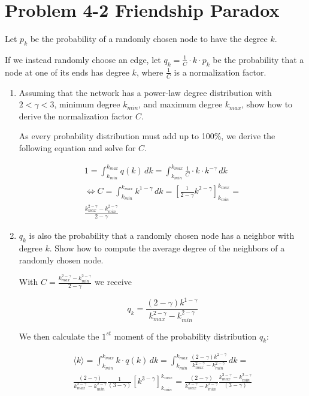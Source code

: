 \section{Problem 4-2 Friendship Paradox}

Let $p_k$ be the probability of a randomly chosen node to have the degree $k$.

If we instead randomly choose an edge, let $q_k = \frac{1}{C} \cdot k \cdot p_k$ be the probability that a node at one of its ends has degree $k$, where $\frac{1}{C}$ is a normalization factor.

\begin{enumerate}
	\item Assuming that the network has a power-law degree distribution with $2 < \gamma
< 3$, minimum degree $k_{min}$, and maximum degree $k_{max}$, show how to derive the normalization factor $C$.
	
	As every probability distribution must add up to 100\%, we derive the following equation and solve for $C$.

	\begin{equation}
		\begin{split}
		1 = \int_{k_{min}}^{k_{max}} q(k) \, dk = \int_{k_{min}}^{k_{max}} \frac{1}{C} \cdot k \cdot k^{-\gamma} \, dk \\
		\Leftrightarrow C = \int_{k_{min}}^{k_{max}} k^{1-\gamma} \, dk = [\frac{1}{2-\gamma} k^{2-\gamma}]_{k_{min}}^{k_{max}} = \\
		\frac{k_{max}^{2-\gamma} - k_{min}^{2-\gamma}}{2-\gamma}
		\end{split}
	\end{equation}
	
	\item $q_k$ is also the probability that a randomly chosen node has a neighbor with degree $k$. Show how to compute the average degree of the neighbors of a randomly chosen node.
	
	With $C = \frac{k_{max}^{2-\gamma} - k_{min}^{2-\gamma}}{2-\gamma}$ we receive
	
	\begin{equation}
		q_k = \frac{(2-\gamma)k^{1-\gamma}}{k_{max}^{2-\gamma} - k_{min}^{2-\gamma}}
	\end{equation}

	We then calculate the $1^{st}$ moment of the probability distribution $q_k$:
	
	\begin{equation} \label{k_neighbors}
		\begin{split}
			\langle k \rangle = \int_{k_{min}}^{k_{max}} k \cdot q(k) \, dk = \int_{k_{min}}^{k_{max}} \frac{(2-\gamma)k^{2-\gamma}}{k_{max}^{2-\gamma} - k_{min}^{2-\gamma}} \, dk = \\
			\frac{(2-\gamma)}{k_{max}^{2-\gamma} - k_{min}^{2-\gamma}} \frac{1}{(3-\gamma)} [k^{3-\gamma}]_{k_{min}}^{k_{max}} = \frac{(2-\gamma)}{k_{max}^{2-\gamma} - k_{min}^{2-\gamma}} \frac{k_{max}^{3-\gamma} - k_{min}^{3-\gamma}}{(3-\gamma)} 
		\end{split}
	\end{equation}
	

\end{enumerate}
